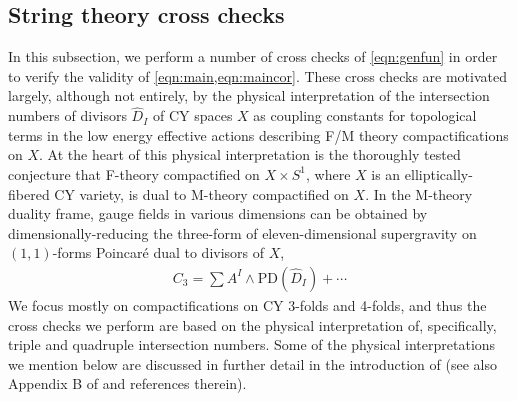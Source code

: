 \documentclass[11pt,oneside,english]{article}
\numberwithin{equation}{section}
\theoremstyle{definition}
\begin{document}
\subsection{String theory cross checks}
\label{sec:crosscheck}

In this subsection, we perform a number of cross checks of \cref{eqn:genfun} in order to verify the validity of \cref{eqn:main,eqn:maincor}. These cross checks are motivated largely, although not entirely, by the physical interpretation of the intersection numbers of divisors $\hat D_I$ of CY spaces $X$ as coupling constants for topological terms in the low energy effective actions describing F/M theory compactifications on $X$. At the heart of this physical interpretation is the thoroughly tested conjecture that F-theory compactified on $X \times S^1$, where $X$ is an elliptically-fibered CY variety, is dual to M-theory compactified on $X$. In the M-theory duality frame, gauge fields in various dimensions can be obtained by dimensionally-reducing the three-form of eleven-dimensional supergravity on $(1,1)$-forms Poincar\'e dual to divisors of $X$, 
	\begin{align}
	\label{eqn:dimred}
		C_3 = \sum A^I \wedge \text{PD}(\hat D_I) + \cdots 
	\end{align}
We focus mostly on compactifications on CY 3-folds and 4-folds, and thus the cross checks we perform are based on the physical interpretation of, specifically, triple and quadruple intersection numbers. Some of the physical interpretations we mention below are discussed in further detail in the introduction of \cite{Jefferson:2022xft} (see also Appendix B of \cite{Jefferson:2021bid} and references therein).\newline
\end{document}
